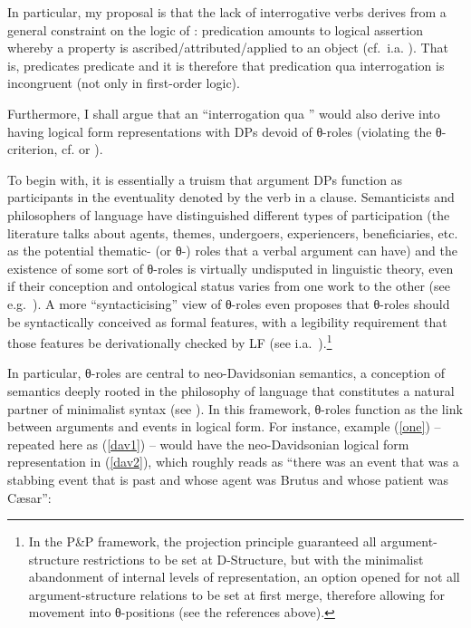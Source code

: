 \documentclass[output=paper]{langsci/langscibook}
\begin{document}
In particular, my proposal is that the lack of interrogative verbs derives from
a general constraint on the logic of : predication amounts to
logical assertion whereby a property is ascribed/attributed/applied to an
object (cf.\ i.a.
\citealt{engel1989,parteeetal1990,mcginn2000,davidson2005,burge2007,liebesman2015}).
That is, predicates predicate and it is therefore that predication qua
interrogation is incongruent (not only in first-order logic).\newpage

Furthermore, I shall argue that an ``interrogation qua ''
would also derive into having logical form representations with DPs devoid of
θ-roles (violating the θ-criterion,  cf.
\citealt{Chomsky1981} or \citealt{Higginbotham1985}).

To begin with, it is essentially a truism that argument DPs function as
participants in the eventuality denoted by the verb in a clause. Semanticists
and philosophers of language have distinguished different types of
participation (the literature talks about agents, themes, undergoers,
experiencers, beneficiaries, etc. as the potential thematic- (or θ-)
roles that a verbal argument can have) and the existence of some sort of
θ-roles is virtually undisputed in linguistic theory, even if their
conception and ontological status varies from one work to the other (see
e.g.\ \citealt{carlson1984,Dowty1989,parsons1995}). A more
``syntacticising'' view of θ-roles even proposes that θ-roles
should be syntactically conceived as formal features, with a legibility
requirement that those features be derivationally checked by \gls{LF} (see
i.a.\
\citealt{boskovic.takahashi1998,hornstein1999,lasnik1999,manzini.roussou2000,fanselow2001,bagchi2007}).\footnote{In
    the P\&P framework, the projection principle guaranteed all
    argument-structure restrictions to be set at D-Structure, but with the
    minimalist abandonment of internal levels of representation, an option
    opened for not all argument-structure relations to be set at first merge,
    therefore allowing for movement into θ-positions (see the references
above).}

In particular, θ-roles are central to neo-Davidsonian semantics, a
conception of semantics deeply rooted in the philosophy of language that
constitutes a natural partner of minimalist syntax (see
\citealt{Parsons1990,parsons1995,herburger2000,hornstein2002,pietroski2002,pietroski2003,pietroski2005,schein2002,irurtzun2007,Lohndal2014}).
In this framework, θ-roles\is{thematic roles} function as the link between arguments and
events in logical form. For instance, example (\ref{one}) -- repeated here as
(\ref{dav1}) -- would have the neo-Davidsonian logical form representation in
(\ref{dav2}), which roughly reads as ``there was an event that was a stabbing
event that is past and whose agent was Brutus and whose patient was
C\ae{}sar'':
\end{document}

